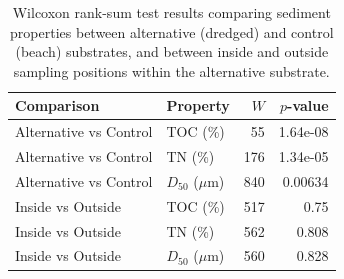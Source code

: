 \begin{table}[htbp]
\centering
\caption{Wilcoxon rank-sum test results comparing sediment properties between alternative (dredged) and control (beach) substrates, and between inside and outside sampling positions within the alternative substrate.}
\label{tab:substrate_stats}
\small
\begin{tabular}{l l r r}
\toprule
Comparison & Property & $W$ & $p$-value \\
\midrule
Alternative vs Control & TOC (\%) & 55 & 1.64e-08 \\
Alternative vs Control & TN (\%) & 176 & 1.34e-05 \\
Alternative vs Control & $D_{50}$ ($\mu$m) & 840 & 0.00634 \\
\midrule
Inside vs Outside & TOC (\%) & 517 & 0.75 \\
Inside vs Outside & TN (\%) & 562 & 0.808 \\
Inside vs Outside & $D_{50}$ ($\mu$m) & 560 & 0.828 \\
\bottomrule
\end{tabular}
\end{table}
